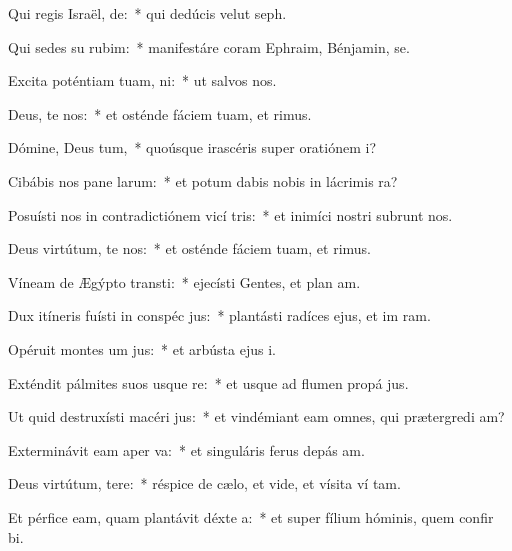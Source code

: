 \item Qui regis Israël, de:~* qui dedúcis velut  seph.
\item Qui sedes su rubim:~* manifestáre coram Ephraim, Bénjamin,  se.
\item Excita poténtiam tuam,  ni:~* ut salvos  nos.
\item Deus, te nos:~* et osténde fáciem tuam, et  rimus.
\item Dómine, Deus tum,~* quoúsque irascéris super oratiónem  i?
\item Cibábis nos pane larum:~* et potum dabis nobis in lácrimis  ra?
\item Posuísti nos in contradictiónem vicí tris:~* et inimíci nostri subrunt nos.
\item Deus virtútum, te nos:~* et osténde fáciem tuam, et  rimus.
\item Víneam de Ægýpto transti:~* ejecísti Gentes, et plan am.
\item Dux itíneris fuísti in conspéc jus:~* plantásti radíces ejus, et im ram.
\item Opéruit montes um jus:~* et arbústa ejus  i.
\item Exténdit pálmites suos usque  re:~* et usque ad flumen propá jus.
\item Ut quid destruxísti macéri jus:~* et vindémiant eam omnes, qui prætergredi am?
\item Exterminávit eam aper  va:~* et singuláris ferus depás  am.
\item Deus virtútum, tere:~* réspice de cælo, et vide, et vísita ví tam.
\item Et pérfice eam, quam plantávit déxte a:~* et super fílium hóminis, quem confir bi.
